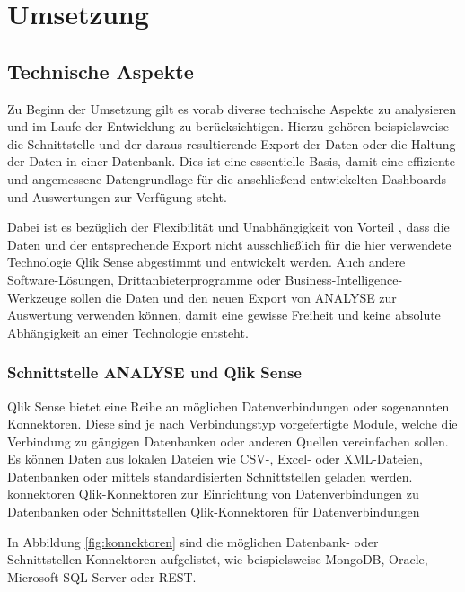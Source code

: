 \chapter{Umsetzung} %
\label{kap:umsetzung}
\minitoc\pagebreak

\section{Technische Aspekte}
\label{sec:tech}
Zu Beginn der Umsetzung gilt es vorab diverse technische Aspekte zu analysieren und im Laufe der Entwicklung zu berücksichtigen.
Hierzu gehören beispielsweise die Schnittstelle und der daraus resultierende Export der Daten oder die Haltung der Daten in einer Datenbank.
Dies ist eine essentielle Basis, damit eine effiziente und angemessene Datengrundlage für die anschließend entwickelten Dashboards und Auswertungen zur Verfügung steht.

Dabei ist es bezüglich der Flexibilität und Unabhängigkeit von Vorteil , dass die Daten und der entsprechende Export nicht ausschließlich für die hier verwendete Technologie Qlik Sense abgestimmt und entwickelt werden.
Auch andere Software-Lösungen, Drittanbieterprogramme oder Business-Intelligence-Werkzeuge sollen die Daten und den neuen Export von \gls{ANALYSE} zur Auswertung verwenden können, damit eine gewisse Freiheit und keine absolute Abhängigkeit an einer Technologie entsteht.

\subsection{Schnittstelle \acrlong*{ANALYSE} und Qlik Sense} %
\label{sub:schnittstelle}
Qlik Sense bietet eine Reihe an möglichen Datenverbindungen oder sogenannten \glqq Konnektoren\grqq.
Diese sind je nach Verbindungstyp vorgefertigte Module, welche die Verbindung zu gängigen Datenbanken oder anderen Quellen vereinfachen sollen.
Es können Daten aus lokalen Dateien wie CSV-, Excel- oder XML-Dateien, Datenbanken oder mittels standardisierten Schnittstellen geladen werden.
\bildbreit
{konnektoren}
{Qlik-Konnektoren zur Einrichtung von Datenverbindungen zu Datenbanken oder Schnittstellen}
{Qlik-Konnektoren für Datenverbindungen }

In Abbildung \ref{fig:konnektoren} sind die möglichen Datenbank- oder Schnittstellen-Konnektoren aufgelistet, wie beispielsweise \glqq MongoDB\grqq, \glqq Oracle\grqq, \glqq Microsoft SQL Server\grqq{} oder \glqq REST\grqq.

